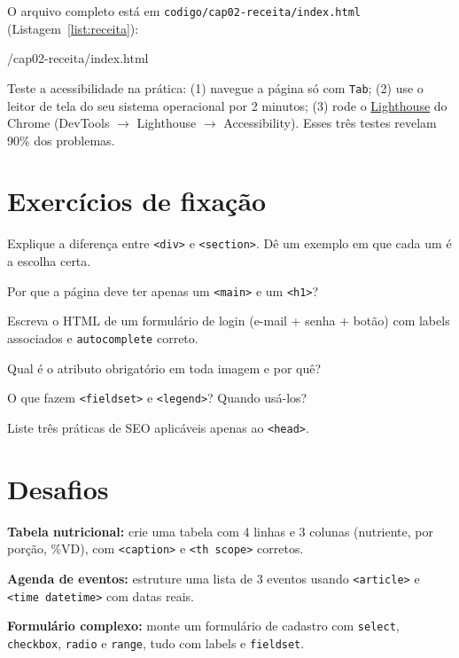 O arquivo completo está em
\texttt{codigo/cap02-receita/index.html} (Listagem~\ref{list:receita}):

  {\codigopath/cap02-receita/index.html}

\begin{caixadica}
Teste a acessibilidade na prática: (1) navegue a página só com \texttt{Tab};
(2) use o leitor de tela do seu sistema operacional por 2 minutos; (3) rode o
\href{https://developers.google.com/web/tools/lighthouse}{Lighthouse} do Chrome
(DevTools $\rightarrow$ Lighthouse $\rightarrow$ Accessibility). Esses três
testes revelam 90\% dos problemas.
\end{caixadica}

\section{Exercícios de fixação}

\begin{exercicios}
  \item Explique a diferença entre \texttt{<div>} e \texttt{<section>}. Dê um
  exemplo em que cada um é a escolha certa.
  \item Por que a página deve ter apenas um \texttt{<main>} e um \texttt{<h1>}?
  \item Escreva o HTML de um formulário de login (e-mail + senha + botão) com
  labels associados e \texttt{autocomplete} correto.
  \item Qual é o atributo obrigatório em toda imagem e por quê?
  \item O que fazem \texttt{<fieldset>} e \texttt{<legend>}? Quando usá-los?
  \item Liste três práticas de SEO aplicáveis apenas ao \texttt{<head>}.
\end{exercicios}

\section{Desafios}

\begin{desafios}
  \item \textbf{Tabela nutricional:} crie uma tabela com 4 linhas e 3 colunas
  (nutriente, por porção, \%VD), com \texttt{<caption>} e \texttt{<th scope>}
  corretos.
  \item \textbf{Agenda de eventos:} estruture uma lista de 3 eventos usando
  \texttt{<article>} e \texttt{<time datetime>} com datas reais.
  \item \textbf{Formulário complexo:} monte um formulário de cadastro com
  \texttt{select}, \texttt{checkbox}, \texttt{radio} e \texttt{range}, tudo com
  labels e \texttt{fieldset}.
\end{desafios}

